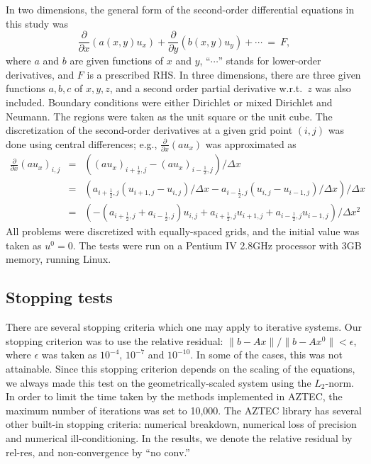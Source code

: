 \documentclass[12pt,a4paper]{article}
\newcounter{i}
\def\half{\scriptstyle \frac{1}{2}}
\begin{document}
In two dimensions, the general form of the second-order differential 
equations in this study was
\[ \frac{\partial}{\partial x}(a(x,y) u_x) +
   \frac{\partial}{\partial y}(b(x,y) u_y) + 
   \cdots ~=~ F,
\]
where $a$ and $b$ are given functions of $x$ and $y$, ``$\cdots$'' 
stands for lower-order derivatives, and $F$ is a prescribed RHS.  
In three dimensions, there are three given functions $a,b,c$ of 
$x,y,z$, and a second order partial derivative w.r.t.\ $z$ was 
also included.  Boundary conditions were either Dirichlet or mixed 
Dirichlet and Neumann.  The regions were taken as the unit square 
or the unit cube.  The discretization of the second-order 
derivatives at a given grid point $(i,j)$ was done using central 
differences; e.g., 
$\frac{\partial}{\partial x}(a u_x)$ was approximated as
\begin{eqnarray*}
\frac{\partial}{\partial x}(a u_x)_{i,j} 
& = & \left((au_x)_{i+\half,j} - (au_x)_{i-\half,j}\right) / \Delta x \\[5pt]
& = & \left(a_{i+\half,j}(u_{i+1,j}-u_{i,j}) / \Delta x -
            a_{i-\half,j}(u_{i,j}-u_{i-1,j}) / \Delta x \right) / \Delta x \\[5pt]
& = & \left( -(a_{i+\half,j} + a_{i-\half,j}) u_{i,j} +
      a_{i+\half,j} u_{i+1,j} + a_{i-\half,j} u_{i-1,j} \right) / \Delta x^2 
\end{eqnarray*}
All problems were discretized with equally-spaced grids, and the initial
value was taken as $u^0=0$.
The tests were run on a Pentium IV 2.8GHz processor with 3GB memory,
running Linux. 



\subsection{Stopping tests}

There are several stopping criteria which one may apply to iterative
systems.  Our stopping criterion was to use the relative residual:
$\|b-Ax\| / \|b-Ax^0\| < \epsilon$, where $\epsilon$ was taken as
$10^{-4}$, $10^{-7}$ and $10^{-10}$.  In some of the cases, this was
not attainable.  Since this stopping criterion depends on the scaling
of the equations, we always made this test on the geometrically-scaled
system using the $L_2$-norm.
In order to limit the time taken by the methods implemented in AZTEC, 
the maximum number of iterations was set to 10,000.  The AZTEC library 
has several other built-in stopping criteria:  numerical breakdown, 
numerical loss of precision and numerical ill-conditioning.
In the results, we denote the relative residual by rel-res, and 
non-convergence by ``no conv.''
\end{document}
